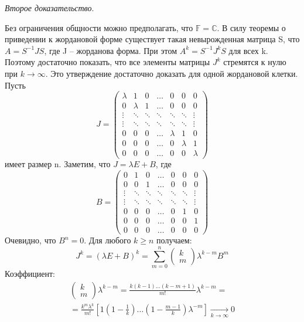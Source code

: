 \begin{Proof}
	\textit{Второе доказательство}.

	Без ограничения общности можно предполагать, что $\mathbb{F} = \mathbb{C}$. В силу теоремы о приведении к жордановой форме существует такая невырожденная матрица S, что $A = S^{−1}JS$, где J – жорданова форма. При этом $A^k = S^{−1}J^kS$ для всех k. Поэтому достаточно показать, что все элементы матрицы $J^k$ стремятся к нулю при $k \to \infty$. Это утверждение достаточно доказать для одной жордановой клетки. Пусть
	$$J = \begin{pmatrix}
		\lambda & 1 & 0 & \dots & 0 & 0 & 0 \\
		0 & \lambda & 1 & \dots & 0 & 0 & 0 \\
		\vdots & \ddots & \ddots & \ddots & \ddots & \ddots & \vdots \\
		\vdots & \ddots & \ddots & \ddots & \ddots & \ddots & \vdots \\
		0 & 0 & 0 & \dots & \lambda & 1 & 0 \\
		0 & 0 & 0 & \dots & 0 & \lambda & 1 \\
		0 & 0 & 0 & \dots & 0 & 0 & \lambda
	\end{pmatrix}$$
	имеет размер n. Заметим, что $J = \lambda E + B$, где
	$$B = \begin{pmatrix}
		0 & 1 & 0 & \dots & 0 & 0 & 0 \\
		0 & 0 & 1 & \dots & 0 & 0 & 0 \\
		\vdots & \ddots & \ddots & \ddots & \ddots & \ddots & \vdots \\
		\vdots & \ddots & \ddots & \ddots & \ddots & \ddots & \vdots \\
		0 & 0 & 0 & \dots & 0 & 1 & 0 \\
		0 & 0 & 0 & \dots & 0 & 0 & 1 \\
		0 & 0 & 0 & \dots & 0 & 0 & 0
	\end{pmatrix}$$
	Очевидно, что $B^n = 0$. Для любого $k \ge n$ получаем:
	$$J^k = (\lambda E + B)^k = \underset{m=0}{\overset{n}{\sum}}\begin{pmatrix}
		k \\ m
	\end{pmatrix}\lambda^{k-m} B^m$$
	Коэффициент:
	$$\begin{gathered}
		\begin{pmatrix}
			k \\ m
		\end{pmatrix}\lambda^{k-m} = \frac{k(k-1)\dots(k-m+1)}{m!}\lambda^{k-m} = \\
		= \frac{k^m \lambda^k}{m!} \left[ 1 \left( 1-\frac{1}{k} \right) \dots \left( 1 - \frac{m-1}{k} \right) \lambda^{-m} \right] \xrightarrow[k\to \infty]{} 0
	\end{gathered}$$
\end{Proof}











